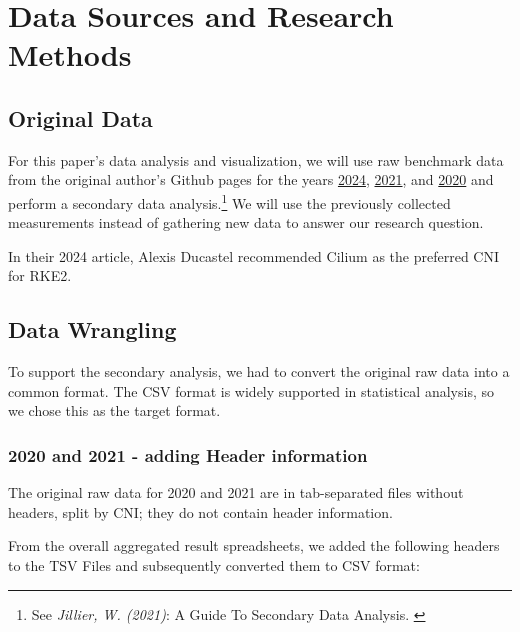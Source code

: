 %
%

\pagebreak
\section{Data Sources and Research Methods}

\onehalfspacing

\subsection{Original Data}

For this paper's data analysis and visualization, we will use raw benchmark data from the original author's Github pages for the years \href{https://github.com/InfraBuilder/benchmark-k8s-cni-2024-01}{2024}, \href{https://github.com/InfraBuilder/benchmark-k8s-cni-2021-05}{2021}, and \href{https://github.com/InfraBuilder/benchmark-k8s-cni-2020-08}{2020} and perform a secondary data analysis.\footnote{See \textit{Jillier, W. (2021)}: A Guide To Secondary Data Analysis. \cite{secondaryDA}} We will use the previously collected measurements instead of gathering new data to answer our research question.

In their 2024 article, Alexis Ducastel recommended Cilium as the preferred CNI for RKE2.

\subsection{Data Wrangling}

To support the secondary analysis, we had to convert the original raw data into a common format. The CSV format is widely supported in statistical analysis, so we chose this as the target format.

\subsubsection{2020 and 2021 - adding Header information}

The original raw data for 2020 and 2021 are in tab-separated files without headers, split by CNI; they do not contain header information.

From the overall aggregated result spreadsheets, we added the following headers to the TSV Files and subsequently converted them to CSV format:


